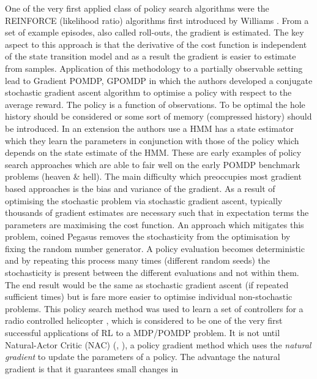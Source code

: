 

One of the very first applied class of policy search algorithms were the REINFORCE (likelihood ratio) algorithms
first introduced by Williams \cite{reinforce_1992}. From a set of example episodes, also called roll-outs, the gradient
is estimated. The key aspect to this approach is that the derivative of the cost function is independent of the state
transition model and as a result the gradient is easier to estimate from samples. Application of this methodology 
to a partially observable setting lead to Gradient POMDP, GPOMDP \cite{gpomdp_2000} in which the authors developed 
a conjugate stochastic gradient ascent algorithm to optimise a policy with respect to the average reward. The policy 
is a function of observations. To be optimal the hole history should be considered or some sort of memory (compressed 
history) should be introduced. In an extension \cite{sis_pomdp_2002} the authors use a HMM has a state 
estimator which they learn the parameters in conjunction with those of the policy which depends on the state estimate 
of the HMM. These are early examples of policy search approaches which are able to fair well on the early POMDP 
benchmark problems (heaven \& hell). 
The main difficulty which preoccupies most gradient based approaches is the bias and variance of the gradient. 
As a result of optimising the stochastic problem via stochastic gradient ascent, typically thousands of gradient estimates are necessary such that in 
expectation terms the parameters are maximising the cost function. An approach which mitigates this problem, coined 
Pegasus \cite{Pegasus_2000} removes the stochasticity from the optimisation by fixing the random number generator.
A policy evaluation becomes deterministic and by repeating this process many times (different random seeds) the stochasticity
is present between the different evaluations and not within them. The end result would be the same as stochastic gradient ascent 
(if repeated sufficient times) but is fare more easier to optimise individual non-stochastic problems. This policy search 
method was used to learn a set of controllers for a radio controlled helicopter \cite{heli_2004}, which is considered to 
be one of the very first successful applications of RL to a MDP/POMDP problem. 
It is not until Natural-Actor Critic (NAC) (\cite{eNAC_2003}, \cite{NAC_2008}), a policy gradient method which uses the \textit{natural 
gradient} to update the parameters of a policy. The advantage the natural gradient is that it guarantees small changes in 
